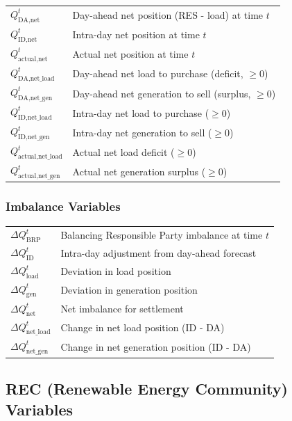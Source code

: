 \begin{tabular}{ll}
$Q_{\text{DA,net}}^{t}$ & Day-ahead net position (RES - load) at time $t$ \\
$Q_{\text{ID,net}}^{t}$ & Intra-day net position at time $t$ \\
$Q_{\text{actual,net}}^{t}$ & Actual net position at time $t$ \\
$Q_{\text{DA,net\_load}}^{t}$ & Day-ahead net load to purchase (deficit, $\geq 0$) \\
$Q_{\text{DA,net\_gen}}^{t}$ & Day-ahead net generation to sell (surplus, $\geq 0$) \\
$Q_{\text{ID,net\_load}}^{t}$ & Intra-day net load to purchase ($\geq 0$) \\
$Q_{\text{ID,net\_gen}}^{t}$ & Intra-day net generation to sell ($\geq 0$) \\
$Q_{\text{actual,net\_load}}^{t}$ & Actual net load deficit ($\geq 0$) \\
$Q_{\text{actual,net\_gen}}^{t}$ & Actual net generation surplus ($\geq 0$) \\
\end{tabular}

\subsubsection{Imbalance Variables}

\begin{tabular}{ll}
$\Delta Q_{\text{BRP}}^{t}$ & Balancing Responsible Party imbalance at time $t$ \\
$\Delta Q_{\text{ID}}^{t}$ & Intra-day adjustment from day-ahead forecast \\
$\Delta Q_{\text{load}}^{t}$ & Deviation in load position \\
$\Delta Q_{\text{gen}}^{t}$ & Deviation in generation position \\
$\Delta Q_{\text{net}}^{t}$ & Net imbalance for settlement \\
$\Delta Q_{\text{net\_load}}^{t}$ & Change in net load position (ID - DA) \\
$\Delta Q_{\text{net\_gen}}^{t}$ & Change in net generation position (ID - DA) \\
\end{tabular}

\subsection{REC (Renewable Energy Community) Variables}

